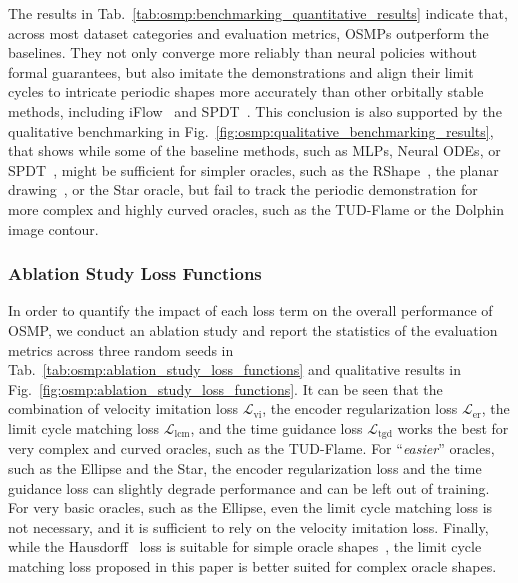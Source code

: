 The results in Tab.~\ref{tab:osmp:benchmarking_quantitative_results} indicate that, across most dataset categories and evaluation metrics, \glspl{OSMP} outperform the baselines. They not only converge more reliably than neural policies without formal guarantees, but also imitate the demonstrations and align their limit cycles to intricate periodic shapes more accurately than other orbitally stable methods, including iFlow~\citep{urain2020imitationflow} and \gls{SPDT}~\citep{zhi2024teaching}.
This conclusion is also supported by the qualitative benchmarking in Fig.~\ref{fig:osmp:qualitative_benchmarking_results}, that shows while some of the baseline methods, such as MLPs, Neural ODEs, or \gls{SPDT}~\citep{zhi2024teaching}, might be sufficient for simpler oracles, such as the RShape~\citep{urain2020imitationflow}, the planar drawing~\citep{nawaz2024learning}, or the Star oracle, but fail to track the periodic demonstration for more complex and highly curved oracles, such as the TUD-Flame or the Dolphin image contour.

\subsubsection{Ablation Study Loss Functions}
In order to quantify the impact of each loss term on the overall performance of \gls{OSMP}, we conduct an ablation study and report the statistics of the evaluation metrics across three random seeds in Tab.~\ref{tab:osmp:ablation_study_loss_functions} and qualitative results in Fig.~\ref{fig:osmp:ablation_study_loss_functions}.
It can be seen that the combination of velocity imitation loss $\mathcal{L}_\mathrm{vi}$, the encoder regularization loss $\mathcal{L}_\mathrm{er}$, the limit cycle matching loss $\mathcal{L}_\mathrm{lcm}$, and the time guidance loss $\mathcal{L}_\mathrm{tgd}$ works the best for very complex and curved oracles, such as the TUD-Flame. For ``\emph{easier}'' oracles, such as the Ellipse and the Star, the encoder regularization loss and the time guidance loss can slightly degrade performance and can be left out of training. For very basic oracles, such as the Ellipse, even the limit cycle matching loss is not necessary, and it is sufficient to rely on the velocity imitation loss.
Finally, while the Hausdorff~\citep{hausdorff1914grundzuge} loss is suitable for simple oracle shapes~\citep{zhi2024teaching}, the limit cycle matching loss proposed in this paper is better suited for complex oracle shapes.

